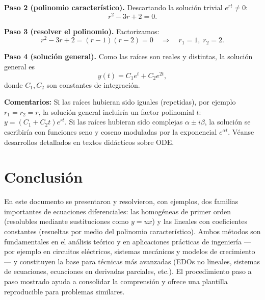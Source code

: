 \documentclass[stu]{apa7} %
\begin{document}
\textbf{Paso 2 (polinomio característico).} Descartando la solución
trivial \(e^{rt}\neq 0\):
\[
r^2 - 3r + 2 = 0.
\]

\textbf{Paso 3 (resolver el polinomio).} Factorizamos:
\[
r^2 -3r +2 = (r-1)(r-2)=0 \quad\Rightarrow\quad r_1=1,\; r_2=2.
\]

\textbf{Paso 4 (solución general).} Como las raíces son reales y distintas,
la solución general es
\[
y(t) = C_1 e^{t} + C_2 e^{2t},
\]
donde \(C_1,C_2\) son constantes de integración.

\textbf{Comentarios:} Si las raíces hubieran sido iguales (repetidas),
por ejemplo \(r_1=r_2=r\), la solución general incluiría un factor
polinomial \(t\): \(y=(C_1 + C_2 t) e^{rt}\). Si las raíces hubieran
sido complejas \(\alpha\pm i\beta\), la solución se escribiría con
funciones seno y coseno moduladas por la exponencial \(e^{\alpha t}\).
Véanse desarrollos detallados en textos didácticos sobre ODE. \parencite{boyce2017, kreyszig2011}

\section{Conclusión}
En este documento se presentaron y resolvieron, con ejemplos, dos
familias importantes de ecuaciones diferenciales: las homogéneas de
primer orden (resolubles mediante sustituciones como \(y=ux\)) y las
lineales con coeficientes constantes (resueltas por medio del
polinomio característico). Ambos métodos son fundamentales en el
análisis teórico y en aplicaciones prácticas de ingeniería —por ejemplo
en circuitos eléctricos, sistemas mecánicos y modelos de crecimiento— y
constituyen la base para técnicas más avanzadas (EDOs no lineales,
sistemas de ecuaciones, ecuaciones en derivadas parciales, etc.). El
procedimiento paso a paso mostrado ayuda a consolidar la comprensión
y ofrece una plantilla reproducible para problemas similares. \par

\printbibliography[title={Referencias}]

\end{document}
